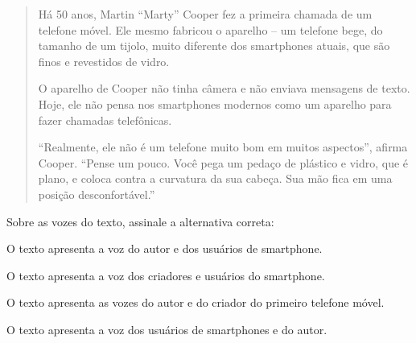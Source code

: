{\begin{quote}
Há 50 anos, Martin ``Marty'' Cooper fez a primeira chamada de um
telefone móvel. Ele mesmo fabricou o aparelho -- um telefone bege, do
tamanho de um tijolo, muito diferente dos smartphones atuais, que são
finos e revestidos de vidro.

O aparelho de Cooper não tinha câmera e não enviava mensagens de texto.
Hoje, ele não pensa nos smartphones modernos como um aparelho
para fazer chamadas telefônicas.

``Realmente, ele não é um telefone muito bom em muitos aspectos'',
afirma Cooper. ``Pense um pouco. Você pega um pedaço de plástico e
vidro, que é plano, e coloca contra a curvatura da sua cabeça. Sua mão
fica em uma posição desconfortável.''

\end{quote}


Sobre as vozes do texto, assinale a alternativa correta:

\begin{escolha}
  
  \item O texto apresenta a voz do autor e dos usuários de smartphone.
  
  \item O texto apresenta a voz dos criadores e usuários do smartphone.
  
  \item O texto apresenta as vozes do autor e do criador do primeiro telefone móvel.
  
  \item O texto apresenta a voz dos usuários de smartphones e do autor.

\end{escolha}

}
